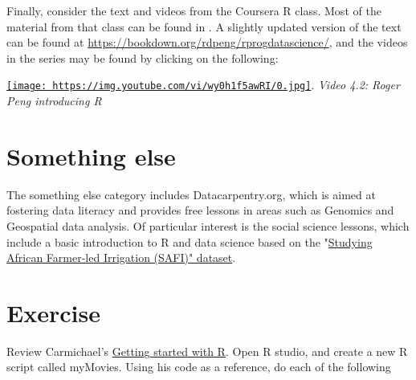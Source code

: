 \documentclass[
  openany]{book}
\begin{document}
Finally, consider the text and videos from the Coursera R class. Most of the material from that class can be found in \citet{peng2015r}. A slightly updated version of the text can be found at \url{https://bookdown.org/rdpeng/rprogdatascience/}, and the videos in the series may be found by clicking on the following:

\href{https://youtu.be/wy0h1f5awRI}{\texttt{[image: https://img.youtube.com/vi/wy0h1f5awRI/0.jpg]}}.
\emph{Video 4.2: Roger Peng introducing R}

\hypertarget{something-else}{%
\section{Something else}\label{something-else}}

The something else category includes Datacarpentry.org, which is aimed at fostering data literacy and provides free lessons in areas such as Genomics and Geospatial data analysis. Of particular interest is the social science lessons, which include a basic introduction to R and data science based on the "\href{https://datacarpentry.org/socialsci-workshop/}{Studying African Farmer-led Irrigation (SAFI)" dataset}.

\hypertarget{exercise}{%
\section{Exercise}\label{exercise}}

Review Carmichael's \href{https://idc9.github.io/stor390/notes/getting_started/getting_started.html}{Getting started with R}. Open R studio, and create a new R script called myMovies. Using his code as a reference, do each of the following
\end{document}
